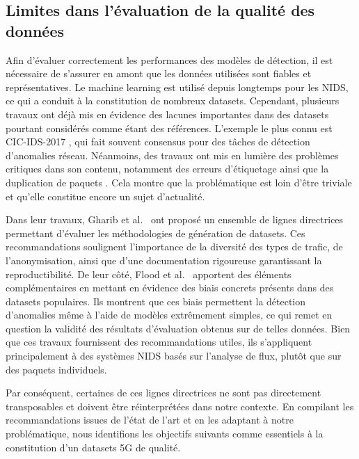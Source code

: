 \documentclass[a4paper,11pt,twoside]{StyleThese}
\begin{document}
\subsection{Limites dans l’évaluation de la qualité des données}
Afin d’évaluer correctement les performances des modèles de détection, il est nécessaire de s’assurer en amont que les données utilisées sont fiables et représentatives. Le machine learning est utilisé depuis longtemps pour les NIDS, ce qui a conduit à la constitution de nombreux datasets. Cependant, plusieurs travaux ont déjà mis en évidence des lacunes importantes dans des datasets pourtant considérés comme étant des références. L’exemple le plus connu est CIC-IDS-2017 \cite{cicids}, qui fait souvent consensus pour des tâches de détection d’anomalies réseau. Néanmoins, des travaux ont mis en lumière des problèmes critiques dans son contenu, notamment des erreurs d’étiquetage ainsi que la duplication de paquets \cite{cicids_crit}. Cela montre que la problématique est loin d’être triviale et qu’elle constitue encore un sujet d’actualité.

Dans leur travaux, Gharib et al.~\cite{eval} ont proposé un ensemble de lignes directrices permettant d’évaluer les méthodologies de génération de datasets. Ces recommandations soulignent l’importance de la diversité des types de trafic, de l’anonymisation, ainsi que d’une documentation rigoureuse garantissant la reproductibilité. De leur côté, Flood et al.~\cite{badsmell} apportent des éléments complémentaires en mettant en évidence des biais concrets présents dans des datasets populaires. Ils montrent que ces biais permettent la détection d’anomalies même à l’aide de modèles extrêmement simples, ce qui remet en question la validité des résultats d’évaluation obtenus sur de telles données. Bien que ces travaux fournissent des recommandations utiles, ils s’appliquent principalement à des systèmes NIDS basés sur l’analyse de flux, plutôt que sur des paquets individuels. 

Par conséquent, certaines de ces lignes directrices ne sont pas directement transposables et doivent être réinterprétées dans notre contexte. En compilant les recommandations issues de l’état de l’art et en les adaptant à notre problématique, nous identifions les objectifs suivants comme essentiels à la constitution d’un datasets 5G de qualité.

\end{document}
